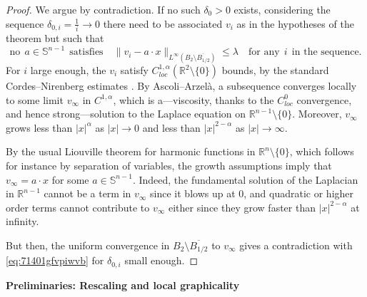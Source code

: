 \documentclass{article}
\newcommand{\R}{\mathbb{R}}
\newcommand{\Sp}{\mathbb{S}}
\theoremstyle{definition}
\begin{document}
\begin{proof}
We argue by contradiction. If no such $\delta_0>0$ exists, considering the sequence $\delta_{0,i}=\frac{1}{i}\to 0$ there need to be associated $v_i$ as in the hypotheses of the theorem but such that
\begin{equation}\label{eq:71401gfvpiwvb}
    \mbox{no}\ \ a\in\Sp^{n-1}\ \ \mbox{satisfies}\quad\|v_i-a\cdot x\|_{L^\infty(B_{2}\setminus \overline{B_{1/2}})
}\leq \lambda\quad\mbox{for any}\ \  i \ \ \mbox{in the sequence.}
\end{equation}
For $i$ large enough, the $v_i$ satisfy $C^{1,\alpha}_{loc}(\R^2\setminus\{0\})$ bounds, by the standard Cordes--Nirenberg estimates \cite{Cordes1956, Nirenberg1954}. By Ascoli--Arzel\`a, a subsequence converges locally to some limit $v_\infty$ in $C^{1,\alpha}$, which is a---viscosity, thanks to the $C^0_{loc}$ convergence, and hence strong---solution to the Laplace equation on $\R^{n-1}\setminus\{0\}$. Moreover, $v_\infty$ grows less than $|x|^\alpha$ as $|x|\to 0$ and less than $|x|^{2-\alpha}$ as $|x|\to\infty$.

By the usual Liouville theorem for harmonic functions in $\R^n\setminus \{0\}$, which follows for instance by separation of variables, the growth assumptions imply that $v_\infty=a\cdot x$ for some $a\in\Sp^{n-1}$. Indeed, the fundamental solution of the Laplacian in $\R^{n-1}$ cannot be a term in $v_\infty$ since it blows up at $0$, and quadratic or higher order terms cannot contribute to $v_\infty$ either since they grow faster than $|x|^{2-\alpha}$ at infinity.

But then, the uniform convergence in $B_2\setminus \overline{B_{1/2}}$ to $v_\infty$ gives a contradiction with \eqref{eq:71401gfvpiwvb} for $\delta_{0,i}$ small enough.
\end{proof}
{\bf Preliminaries: Rescaling and local graphicality}
\end{document}
